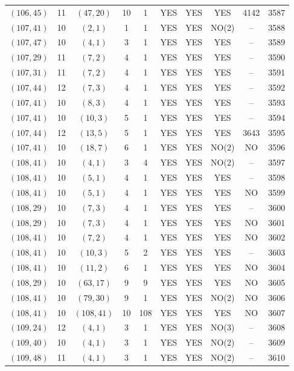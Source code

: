 \begin{longtable}{|c|c|c|c|c|c|c|c|c|c|}
$(106, 45)$ & 11 & $(47, 20)$ & 10 & 1 & YES & YES & YES & 4142 & 3587\\
$(107, 41)$ & 10 & $(2, 1)$ & 1 & 1 & YES & YES & NO(2) & -- & 3588\\
$(107, 47)$ & 10 & $(4, 1)$ & 3 & 1 & YES & YES & YES & -- & 3589\\
$(107, 29)$ & 11 & $(7, 2)$ & 4 & 1 & YES & YES & YES & -- & 3590\\
$(107, 31)$ & 11 & $(7, 2)$ & 4 & 1 & YES & YES & YES & -- & 3591\\
$(107, 44)$ & 12 & $(7, 3)$ & 4 & 1 & YES & YES & YES & -- & 3592\\
$(107, 41)$ & 10 & $(8, 3)$ & 4 & 1 & YES & YES & YES & -- & 3593\\
$(107, 41)$ & 10 & $(10, 3)$ & 5 & 1 & YES & YES & YES & -- & 3594\\
$(107, 44)$ & 12 & $(13, 5)$ & 5 & 1 & YES & YES & YES & 3643 & 3595\\
$(107, 41)$ & 10 & $(18, 7)$ & 6 & 1 & YES & YES & NO(2) & NO & 3596\\
$(108, 41)$ & 10 & $(4, 1)$ & 3 & 4 & YES & YES & NO(2) & -- & 3597\\
$(108, 41)$ & 10 & $(5, 1)$ & 4 & 1 & YES & YES & YES & -- & 3598\\
$(108, 41)$ & 10 & $(5, 1)$ & 4 & 1 & YES & YES & YES & NO & 3599\\
$(108, 29)$ & 10 & $(7, 3)$ & 4 & 1 & YES & YES & YES & -- & 3600\\
$(108, 29)$ & 10 & $(7, 3)$ & 4 & 1 & YES & YES & YES & NO & 3601\\
$(108, 41)$ & 10 & $(7, 2)$ & 4 & 1 & YES & YES & YES & NO & 3602\\
$(108, 41)$ & 10 & $(10, 3)$ & 5 & 2 & YES & YES & YES & -- & 3603\\
$(108, 41)$ & 10 & $(11, 2)$ & 6 & 1 & YES & YES & YES & NO & 3604\\
$(108, 29)$ & 10 & $(63, 17)$ & 9 & 9 & YES & YES & YES & NO & 3605\\
$(108, 41)$ & 10 & $(79, 30)$ & 9 & 1 & YES & YES & NO(2) & NO & 3606\\
$(108, 41)$ & 10 & $(108, 41)$ & 10 & 108 & YES & YES & YES & NO & 3607\\
$(109, 24)$ & 12 & $(4, 1)$ & 3 & 1 & YES & YES & NO(3) & -- & 3608\\
$(109, 40)$ & 10 & $(4, 1)$ & 3 & 1 & YES & YES & NO(2) & -- & 3609\\
$(109, 48)$ & 11 & $(4, 1)$ & 3 & 1 & YES & YES & NO(2) & -- & 3610\\

\end{longtable}
